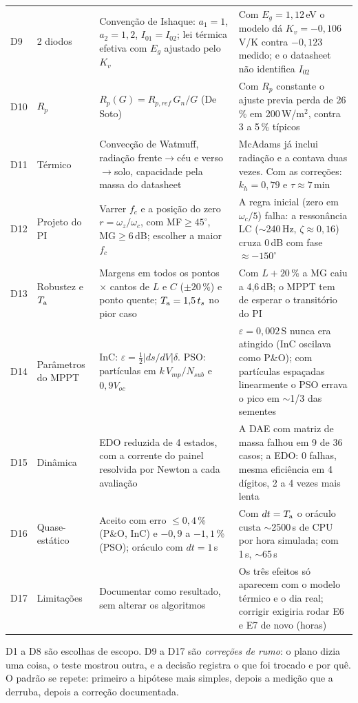 {\begin{longtable}{@{}p{0.7cm}p{2.5cm}p{5.6cm}p{6.6cm}@{}}
D9 & 2 diodos & Conven\c{c}\~ao de Ishaque: $a_1=1$, $a_2=1{,}2$, $I_{01}=I_{02}$; lei t\'ermica efetiva com $E_g$ ajustado pelo $K_v$
  & Com $E_g=1{,}12$\,eV o modelo d\'a $K_v=-0{,}106$\,V/K contra $-0{,}123$ medido; e o datasheet n\~ao identifica $I_{02}$ \\
D10 & $R_p$ & $R_p(G)=R_{p,ref}\,G_n/G$ (De Soto)
  & Com $R_p$ constante o ajuste previa perda de 26\,\% em 200\,W/m$^2$, contra 3 a 5\,\% t\'ipicos \\
D11 & T\'ermico & Convec\c{c}\~ao de Watmuff, radia\c{c}\~ao frente$\to$c\'eu e verso$\to$solo, capacidade pela massa do datasheet
  & McAdams j\'a inclui radia\c{c}\~ao e a contava duas vezes. Com as corre\c{c}\~oes: $k_h=0{,}79$ e $\tau\approx7$\,min \\
D12 & Projeto do PI & Varrer $f_c$ e a posi\c{c}\~ao do zero $r=\omega_z/\omega_c$, com MF$\ge45^\circ$, MG$\ge6$\,dB; escolher a maior $f_c$
  & A regra inicial (zero em $\omega_c/5$) falha: a resson\^ancia LC ($\sim$240\,Hz, $\zeta\approx0{,}16$) cruza 0\,dB com fase $\approx-150^\circ$ \\
D13 & Robustez e $T_{\mathrm{a}}$ & Margens em todos os pontos $\times$ cantos de $L$ e $C$ ($\pm20$\,\%) e ponto quente; $T_{\mathrm{a}}=1{,}5\,t_s$ no pior caso
  & Com $L+20$\,\% a MG caiu a 4,6\,dB; o MPPT tem de esperar o transit\'orio do PI \\
D14 & Par\^ametros do MPPT & InC: $\varepsilon=\tfrac12|ds/dV|\delta$. PSO: part\'iculas em $k\,V_{mp}/N_{sub}$ e $0{,}9V_{oc}$
  & $\varepsilon=0{,}002$\,S nunca era atingido (InC oscilava como P\&O); com part\'iculas espa\c{c}adas linearmente o PSO errava o pico em $\sim$1/3 das sementes \\
D15 & Din\^amica & EDO reduzida de 4 estados, com a corrente do painel resolvida por Newton a cada avalia\c{c}\~ao
  & A DAE com matriz de massa falhou em 9 de 36 casos; a EDO: 0 falhas, mesma efici\^encia em 4 d\'igitos, 2 a 4 vezes mais lenta \\
D16 & Quase-est\'atico & Aceito com erro $\le0{,}4$\,\% (P\&O, InC) e $-0{,}9$ a $-1{,}1$\,\% (PSO); or\'aculo com $dt=1$\,s
  & Com $dt=T_{\mathrm{a}}$ o or\'aculo custa $\sim$2500\,s de CPU por hora simulada; com 1\,s, $\sim$65\,s \\
D17 & Limita\c{c}\~oes & Documentar como resultado, sem alterar os algoritmos
  & Os tr\^es efeitos s\'o aparecem com o modelo t\'ermico e o dia real; corrigir exigiria rodar E6 e E7 de novo (horas) \\
\bottomrule
\end{longtable}}

\begin{resumo}
D1 a D8 s\~ao escolhas de escopo. D9 a D17 s\~ao \emph{corre\c{c}\~oes de rumo}: o plano dizia uma
coisa, o teste mostrou outra, e a decis\~ao registra o que foi trocado e por qu\^e. O padr\~ao se
repete: primeiro a hip\'otese mais simples, depois a medi\c{c}\~ao que a derruba, depois a
corre\c{c}\~ao documentada.
\end{resumo}
